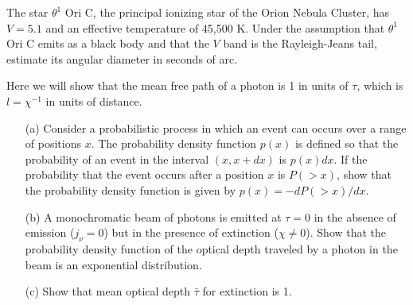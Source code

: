 \begin{problem}
The star $\theta^1$ Ori C, the principal ionizing star of the Orion Nebula Cluster, has $V = 5.1$ and an effective temperature of 45,500 K. Under the assumption that $\theta^1$ Ori C emits as a black body and that the $V$ band is the Rayleigh-Jeans tail, estimate its angular diameter in seconds of arc.
\end{problem}


\clearpage
\problemset

\begin{problem}
\label{problem-optical-depth}
Here we will show that the mean free path of a photon is
1 in units of $\tau$, which is $l = \chi^{-1}$ in units of distance.
\begin{enumerate}
\item[(a)]
Consider a probabilistic process in which an event can occurs over a range of positions $x$. The probability density function $p(x)$ is defined so that the probability of an event in the interval $(x,x+dx)$ is $p(x)dx$. If the probability that the event occurs after a position $x$ is $P(>\!\!x)$, show that the probability density function is given by $p(x) = -dP(>\!\!x)/dx$.
\item[(b)]
A monochromatic beam of photons is emitted at $\tau = 0$ in the
absence of emission ($j_\nu = 0$) but in the presence of
extinction ($\chi \ne 0$).
Show that the probability density function of the optical depth traveled by a photon in the beam
is an exponential distribution.
\item[(c)]
Show that mean optical depth $\bar\tau$ for extinction is 1.
\end{enumerate}
\end{problem}



